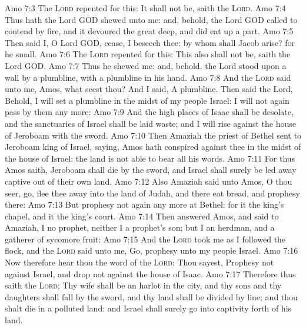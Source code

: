 \vs Amo 7:3 The \textsc{Lord} repented for this: It shall not be, saith the \textsc{Lord}.
\vs Amo 7:4 Thus hath the Lord GOD shewed unto me: and, behold, the Lord GOD called to contend by fire, and it devoured the great deep, and did eat up a part.
\vs Amo 7:5 Then said I, O Lord GOD, cease, I beseech thee: by whom shall Jacob arise? for he  small.
\vs Amo 7:6 The \textsc{Lord} repented for this: This also shall not be, saith the Lord GOD.
\vs Amo 7:7 Thus he shewed me: and, behold, the Lord stood upon a wall  by a plumbline, with a plumbline in his hand.
\vs Amo 7:8 And the \textsc{Lord} said unto me, Amos, what seest thou? And I said, A plumbline. Then said the Lord, Behold, I will set a plumbline in the midst of my people Israel: I will not again pass by them any more:
\vs Amo 7:9 And the high places of Isaac shall be desolate, and the sanctuaries of Israel shall be laid waste; and I will rise against the house of Jeroboam with the sword.
\vs Amo 7:10 Then Amaziah the priest of Bethel sent to Jeroboam king of Israel, saying, Amos hath conspired against thee in the midst of the house of Israel: the land is not able to bear all his words.
\vs Amo 7:11 For thus Amos saith, Jeroboam shall die by the sword, and Israel shall surely be led away captive out of their own land.
\vs Amo 7:12 Also Amaziah said unto Amos, O thou seer, go, flee thee away into the land of Judah, and there eat bread, and prophesy there:
\vs Amo 7:13 But prophesy not again any more at Bethel: for it  the king's chapel, and it  the king's court.
\vs Amo 7:14 Then answered Amos, and said to Amaziah, I  no prophet, neither  I a prophet's son; but I  an herdman, and a gatherer of sycomore fruit:
\vs Amo 7:15 And the \textsc{Lord} took me as I followed the flock, and the \textsc{Lord} said unto me, Go, prophesy unto my people Israel.
\vs Amo 7:16 Now therefore hear thou the word of the \textsc{Lord}: Thou sayest, Prophesy not against Israel, and drop not  against the house of Isaac.
\vs Amo 7:17 Therefore thus saith the \textsc{Lord}; Thy wife shall be an harlot in the city, and thy sons and thy daughters shall fall by the sword, and thy land shall be divided by line; and thou shalt die in a polluted land: and Israel shall surely go into captivity forth of his land.
